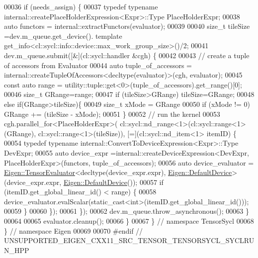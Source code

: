 \begin{DoxyCode}
00036   \textcolor{keywordflow}{if} (needs\_assign) \{
00037     \textcolor{keyword}{typedef}  \textcolor{keyword}{typename} internal::createPlaceHolderExpression<Expr>::Type PlaceHolderExpr;
00038     \textcolor{keyword}{auto} functors = internal::extractFunctors(evaluator);
00039 
00040     \textcolor{keywordtype}{size\_t} tileSize =dev.m\_queue.get\_device(). \textcolor{keyword}{template} 
      get\_info<cl::sycl::info::device::max\_work\_group\_size>()/2;
00041     dev.m\_queue.submit([&](cl::sycl::handler &cgh) \{
00042 
00043       \textcolor{comment}{// create a tuple of accessors from Evaluator}
00044       \textcolor{keyword}{auto} tuple\_of\_accessors = internal::createTupleOfAccessors<decltype(evaluator)>(cgh, evaluator);
00045       \textcolor{keyword}{const} \textcolor{keyword}{auto} range = utility::tuple::get<0>(tuple\_of\_accessors).get\_range()[0];
00046       \textcolor{keywordtype}{size\_t} GRange=range;
00047       \textcolor{keywordflow}{if} (tileSize>GRange) tileSize=GRange;
00048       \textcolor{keywordflow}{else} \textcolor{keywordflow}{if}(GRange>tileSize)\{
00049         \textcolor{keywordtype}{size\_t} xMode = GRange %
00050         \textcolor{keywordflow}{if} (xMode != 0) GRange += (tileSize - xMode);
00051       \}
00052       \textcolor{comment}{// run the kernel}
00053       cgh.parallel\_for<PlaceHolderExpr>( cl::sycl::nd\_range<1>(cl::sycl::range<1>(GRange), 
      cl::sycl::range<1>(tileSize)), [=](cl::sycl::nd\_item<1> itemID) \{
00054         \textcolor{keyword}{typedef}  \textcolor{keyword}{typename} internal::ConvertToDeviceExpression<Expr>::Type DevExpr;
00055         \textcolor{keyword}{auto} device\_expr =internal::createDeviceExpression<DevExpr, PlaceHolderExpr>(functors, 
      tuple\_of\_accessors);
00056         \textcolor{keyword}{auto} device\_evaluator = \hyperlink{struct_eigen_1_1_tensor_evaluator}{Eigen::TensorEvaluator}<decltype(device\_expr.expr), 
      \hyperlink{struct_eigen_1_1_default_device}{Eigen::DefaultDevice}>(device\_expr.expr, \hyperlink{struct_eigen_1_1_default_device}{Eigen::DefaultDevice}());
00057         \textcolor{keywordflow}{if} (itemID.get\_global\_linear\_id() < range) \{
00058           device\_evaluator.evalScalar(static\_cast<int>(itemID.get\_global\_linear\_id()));
00059         \}
00060       \});
00061     \});
00062     dev.m\_queue.throw\_asynchronous();
00063   \}
00064 
00065   evaluator.cleanup();
00066 \}
00067 \}  \textcolor{comment}{// namespace TensorSycl}
00068 \}  \textcolor{comment}{// namespace Eigen}
00069 
00070 \textcolor{preprocessor}{#endif  // UNSUPPORTED\_EIGEN\_CXX11\_SRC\_TENSOR\_TENSORSYCL\_SYCLRUN\_HPP}
\end{DoxyCode}
